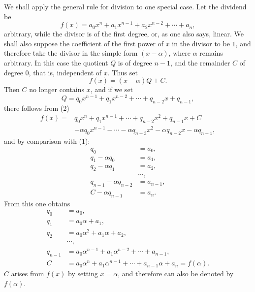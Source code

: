 \documentclass[11pt]{article}
\begin{document}
We shall apply the general rule for division to one special case. Let the dividend be
\begin{equation}
 f(x)=a_0x^n+a_1x^{n-1}+a_2x^{n-2}+\cdots+a_n,
\tag{1}
\end{equation}
arbitrary, while the divisor is of the first degree, or, as one also says, linear. We shall also suppose the coefficient of the first power of $x$ in the divisor to be $1$, and therefore take the divisor in the simple form $(x-\alpha)$, where $\alpha$ remains arbitrary. In this case the quotient $Q$ is of degree $n-1$, and the remainder $C$ of degree $0$, that is, independent of $x$. Thus set
\begin{equation}
 f(x)=(x-\alpha)Q+C.
\tag{2}
\end{equation}
Then $C$ no longer contains $x$, and if we set
\begin{equation}
 Q=q_0x^{n-1}+q_1x^{n-2}+\cdots+q_{n-2}x+q_{n-1},
\tag{3}
\end{equation}
there follows from (2)
\begin{equation}
\begin{aligned}
 f(x)={}&q_0x^n+q_1x^{n-1}+\cdots+q_{n-2}x^2+q_{n-1}x+C\\
&-\alpha q_0x^{n-1}-\cdots-\alpha q_{n-3}x^2-\alpha q_{n-2}x-\alpha q_{n-1},
\end{aligned}
\tag{4}
\end{equation}
and by comparison with (1):
\begin{equation}
\begin{aligned}
q_0&=a_0,\\
q_1-\alpha q_0&=a_1,\\
q_2-\alpha q_1&=a_2,\\
&\cdots,\\
q_{n-1}-\alpha q_{n-2}&=a_{n-1},\\
C-\alpha q_{n-1}&=a_n.
\end{aligned}
\tag{5}
\end{equation}
From this one obtains
\begin{equation}
\begin{aligned}
q_0&=a_0,\\
q_1&=a_0\alpha+a_1,\\
q_2&=a_0\alpha^2+a_1\alpha+a_2,\\
&\cdots,\\
q_{n-1}&=a_0\alpha^{n-1}+a_1\alpha^{n-2}+\cdots+a_{n-1},\\
C&=a_0\alpha^n+a_1\alpha^{n-1}+\cdots+a_{n-1}\alpha+a_n=f(\alpha).
\end{aligned}
\tag{6}
\end{equation}
$C$ arises from $f(x)$ by setting $x=\alpha$, and therefore can also be denoted by $f(\alpha)$.
\end{document}
